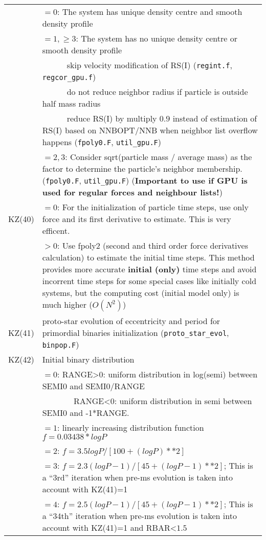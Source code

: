 \begin{longtable}{@{}p{1.5cm}p{13.0cm}}
        & $=0$: The system has unique density centre and smooth density profile\\
        & $=1,\ge 3$: The system has no unique density centre or smooth density profile\\
        & ~~~~~~skip velocity modification of RS(I) (\texttt{regint.f}, \texttt{regcor\_gpu.f}) \\
        & ~~~~~~do not reduce neighbor radius if particle is outside half mass radius \\
        & ~~~~~~reduce RS(I) by multiply $0.9$ instead of estimation of RS(I) based on NNBOPT/NNB when neighbor list overflow happens (\texttt{fpoly0.F}, \texttt{util\_gpu.F}) \\
        & $=2,3$: Consider sqrt(particle mass / average mass) as the factor to determine the particle's neighbor membership. (\texttt{fpoly0.F}, \texttt{util\_gpu.F}) ({\bf Important to use if GPU is used for regular forces and neighbour lists!}) \\
KZ(40)  & $=0$: For the initialization of particle time steps, use only force and its first derivative to estimate. This is very efficent.\\
        & $>0$: Use fpoly2 (second and third order force derivatives calculation) to estimate the initial time steps. This method provides more accurate {\bf initial (only)} time steps and avoid incorrent time steps for some special cases like initially cold systems, but the computing cost (initial model only) is much higher ($O(N^2)$)\\
KZ(41)  & proto-star evolution of eccentricity and period for primordial binaries initialization (\texttt{proto\_star\_evol}, \texttt{binpop.F}) \\
KZ(42)  & Initial binary distribution \\
        & $=0$: RANGE>0: uniform distribution in log(semi) between SEMI0 and SEMI0/RANGE \\
        & ~~~~~~~ RANGE<0: uniform distribution in semi between SEMI0 and -1*RANGE. \\
        & $=1$: linearly increasing distribution function $f=0.03438*logP$ \\
        & $=2$: $f=3.5logP/[100+(logP)**2]$ \\
        & $=3$: $f=2.3(logP-1)/[45+(logP-1)**2]$; This is a ``3rd'' iteration when  pre-ms evolution is taken into account with KZ(41)=1 \\
        & $=4$: $f=2.5(logP-1)/[45+(logP-1)**2]$; This is a ``34th'' iteration when pre-ms evolution is taken into account with KZ(41)=1 and RBAR<$1.5$ \\

\end{longtable}
